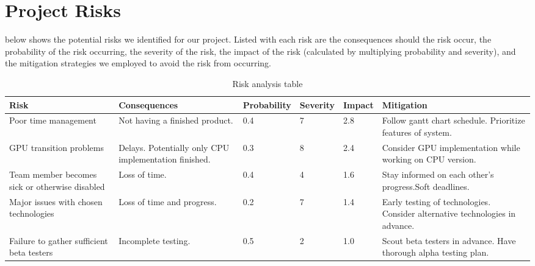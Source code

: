 \chapter{Project Risks}
 below shows the potential risks we identified for our project. Listed with each risk are the consequences should the risk occur, the probability of the risk occurring, the severity of the risk, the impact of the risk (calculated by multiplying probability and severity), and the mitigation strategies we employed to avoid the risk from occurring.
\newline
\begin{table}[!h]
\def\arraystretch{1.5}
\begin{tabulary}{\textwidth}{|L{2.3cm}|L{2.5cm}|L{2cm}|L{1.5cm}|L{1.3cm}|L{2.9cm}|}
\hline
\textbf{Risk} & \textbf{Consequences} & \textbf{Probability} & \textbf{Severity} & \textbf{Impact} & \textbf{Mitigation} \\
\hline\hline
Poor time management & Not having a finished product. & 0.4 & 7 & 2.8 & Follow gantt chart schedule. Prioritize features of system. \\ \hline
GPU transition problems & Delays. Potentially only CPU implementation finished. & 0.3 & 8 & 2.4 & Consider GPU implementation while working on CPU version. \\ \hline
Team member becomes sick or otherwise disabled & Loss of time. & 0.4 & 4 & 1.6 & Stay informed on each other's progress.Soft deadlines. \\ \hline
Major issues with chosen technologies & Loss of time and progress. & 0.2 & 7 & 1.4 & Early testing of technologies. Consider alternative technologies in advance. \\ \hline
Failure to gather sufficient beta testers & Incomplete testing. & 0.5 & 2 & 1.0 & Scout beta testers in advance. Have thorough alpha testing plan. \\ \hline
\end{tabulary}
\caption{Risk analysis table}
\label{table:risks}
\end{table}